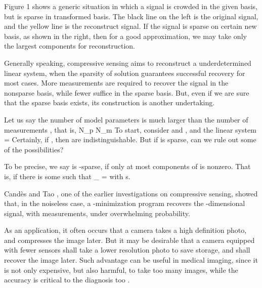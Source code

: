 Figure 1 shows a generic situation in which a signal is crowded in the given basis, but is sparse in transformed basis.
The black line on the left is the original signal, and the yellow line is the reconstruct signal.
If the signal is sparse on certain new basis, as shown in the right, then for a good approximation, we may take only the largest components for reconstruction.

Generally speaking, compressive sensing aims to reconstruct a underdetermined linear system, when the sparsity of solution guarantees successful recovery for most cases.
More measurements are required to recover the signal in the nonsparse basis, while fewer suffice in the sparse basis.
But, even if we are sure that the sparse basis exists, its construction is another undertaking.

Let us say the number of model parameters  is much larger than the number of measurements , that is,
%
 {
N_p \gg N_m 
}
%
To start, consider  and , and the linear system
%
 {
=  
}
Certainly, if , then  are indistinguishable.
But if  is sparse, can we rule out some of the possibilities?

To be precise, we say  is -sparse, if only at most  components of  is nonzero.
That is, if there is some  such that
%
 {
 _{}
= 
}
%
with
%
 {
 \leq s. 
}

Candès and Tao \cite {Can05}, one of the earlier investigations on compressive sensing, showed that, in the noiseless case, a -minimization program recovers the -dimensional signal, with  measurements, under overwhelming probability.

As an application, it often occurs that a camera takes a high definition photo, and compresses the image later.
But it may be desirable that a camera equipped with fewer sensors shall take a lower resolution photo to save storage, and shall recover the image later.
Such advantage can be useful in medical imaging, since it is not only expensive, but also harmful, to take too many images, while the accuracy is critical to the diagnosis too \cite {CaT07}.



